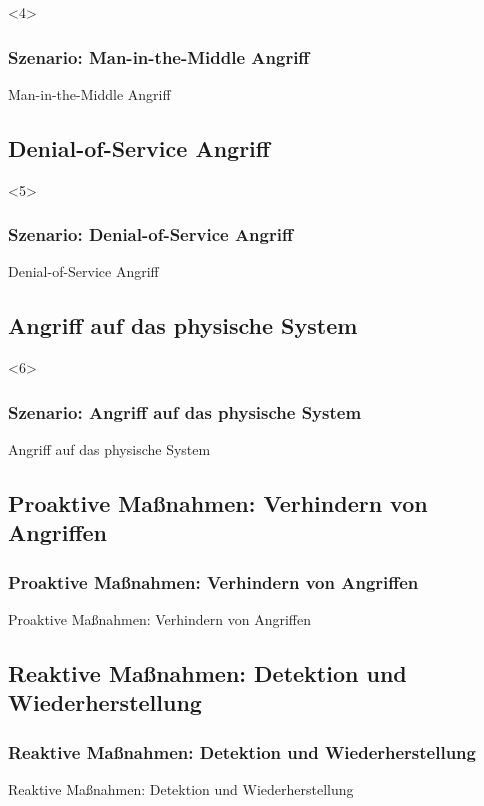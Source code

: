 \documentclass{sikslides}
\begin{document}
    \begin{frame}
        <4>
        \frametitle{Szenario: Man-in-the-Middle Angriff}
        Man-in-the-Middle Angriff
    \end{frame}

    \subsection{Denial-of-Service Angriff}
    \begin{frame}
        <5>
        \frametitle{Szenario: Denial-of-Service Angriff}
        Denial-of-Service Angriff
    \end{frame}

    \subsection{Angriff auf das physische System}
    \begin{frame}
        <6>
        \frametitle{Szenario: Angriff auf das physische System}
        Angriff auf das physische System
    \end{frame}


    \subsection{Proaktive Maßnahmen: Verhindern von Angriffen}
    \begin{frame}
        \frametitle{Proaktive Maßnahmen: Verhindern von Angriffen}
        Proaktive Maßnahmen: Verhindern von Angriffen
    \end{frame}
    \subsection{Reaktive Maßnahmen: Detektion und Wiederherstellung}
    \begin{frame}
        \frametitle{Reaktive Maßnahmen: Detektion und Wiederherstellung}
        Reaktive Maßnahmen: Detektion und Wiederherstellung
    \end{frame}
\end{document}
